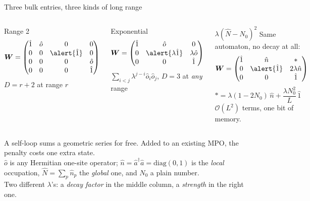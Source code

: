 \documentclass[aspectratio=169,10pt]{beamer}
\newcommand{\bigO}{\mathcal{O}}
\newcommand{\bmat}[1]{\bm{#1}}
\begin{document}
\begin{frame}{Three bulk entries, three kinds of long range}
  \begin{columns}[T]
    \begin{block}{Range 2}
      \[\bmat W=\begin{pmatrix}\hat1&\hat o&0&0\\0&0&\alert{\hat1}&0\\0&0&0&\hat o\\0&0&0&\hat1\end{pmatrix}\]
      \centering $D=r+2$ at range $r$
    \end{block}
    \begin{block}{Exponential}
      \[\bmat W=\begin{pmatrix}\hat1&\hat o&0\\0&\alert{\lambda\hat1}&\lambda\hat o\\0&0&\hat1\end{pmatrix}\]
      \centering $\sum_{i<j}\lambda^{j-i}\hat o_i\hat o_j$, $D=3$ at \emph{any} range
    \end{block}
    \begin{block}{$\lambda(\hat N-N_0)^2$}
      Same automaton, \alert{no decay at all}:
      \[\bmat W=\begin{pmatrix}\hat1&\hat n&\ast\\0&\alert{\hat1}&2\lambda\hat n\\0&0&\hat1\end{pmatrix}\]
      \centering\scriptsize $\ast=\lambda(1-2N_0)\,\hat n+\dfrac{\lambda N_0^2}{L}\,\hat1$\\[3pt]
      $\bigO(L^2)$ terms, \alert{one bit} of memory.
    \end{block}
  \end{columns}
  \vspace{0.5em}
A self-loop sums a geometric series for free. Added to an existing MPO, the penalty costs \alert{one} extra state.\\[2pt]
  {\scriptsize $\hat o$ is any Hermitian one-site operator; $\hat n=\hat a^\dagger\hat a=\mathrm{diag}(0,1)$ is the
  \emph{local} occupation, $\hat N=\sum_p\hat n_p$ the \emph{global} one, and $N_0$ a plain number.\\
  Two different $\lambda$'s: a \emph{decay factor} in the middle column, a \emph{strength} in the right one.}
\end{frame}
\end{document}

